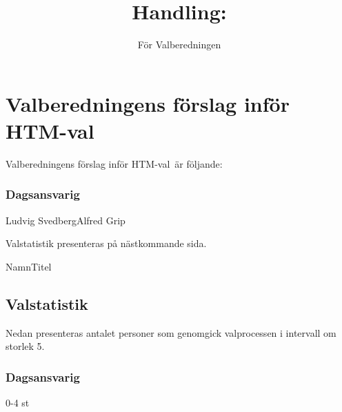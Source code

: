 \documentclass[nopdfbookmarks,a4paper, 11pt, twoside]{article}
\title{Handling: \TITLE}
\newcommand{\MOTE}{HTM-val} %
\newcommand{\WHATWHO}[2]{\subsubsection*{#1}#2}
\newcommand{\WHATCOUNT}[2]{\subsubsection*{#1}#2 st}
\begin{document}
\section*{Valberedningens förslag inför \MOTE}

Valberedningens förslag inför \MOTE \ är följande:
\begin{multicols}{2}  

\WHATWHO{Dagsansvarig}{ Ludvig Svedberg\newline Alfred Grip}

\end{multicols}

{Valstatistik presenteras på nästkommande sida.\newline}

\signature{För Valberedningen}{Namn}{Titel}

\newpage
\subsection*{Valstatistik}
Nedan presenteras antalet personer som genomgick valprocessen i intervall om storlek 5.

\begin{multicols}{2}

\WHATCOUNT{Dagsansvarig}{0-4}

\end{multicols}
\end{document}
